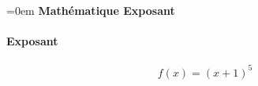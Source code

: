 \documentclass{article}
\begin{document}
\parindent=0em
\textbf{Mathématique Exposant} \\ \\
\textbf{Exposant} \\ \\
$$f(x)=(x+1)^{5}$$ \\ \\
\end{document}
